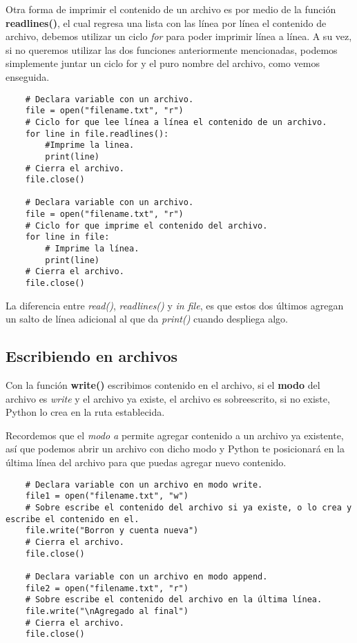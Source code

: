 Otra forma de imprimir el contenido de un archivo es por medio de la función \textbf{readlines()}, el cual regresa una lista con las línea por línea el contenido de archivo, debemos utilizar un ciclo \textit{for} para poder imprimir línea a línea. A su vez, si no queremos utilizar las dos funciones anteriormente mencionadas, podemos simplemente juntar un ciclo for y el puro nombre del archivo, como vemos enseguida.
\begin{lstlisting}
    # Declara variable con un archivo.
    file = open("filename.txt", "r")
    # Ciclo for que lee línea a línea el contenido de un archivo.
    for line in file.readlines():
        #Imprime la linea.
        print(line)
    # Cierra el archivo.
    file.close()

    # Declara variable con un archivo.
    file = open("filename.txt", "r")
    # Ciclo for que imprime el contenido del archivo.
    for line in file:
        # Imprime la línea.
        print(line)
    # Cierra el archivo.
    file.close()
\end{lstlisting}

La diferencia entre \textit{read()}, \textit{readlines()} y \textit{in file}, es que estos dos últimos agregan un salto de línea adicional al que da \textit{print()} cuando despliega algo.


\subsection{Escribiendo en archivos}

Con la función \textbf{write()} escribimos contenido en el archivo, si el \textbf{modo} del archivo es \textit{write} y el archivo ya existe, el archivo es sobreescrito, si no existe, Python lo crea en la ruta establecida.

Recordemos que el \textit{modo a} permite agregar contenido a un archivo ya existente, así que podemos abrir un archivo con dicho modo y Python te posicionará en la última línea del archivo para que puedas agregar nuevo contenido.
\begin{lstlisting}
    # Declara variable con un archivo en modo write.
    file1 = open("filename.txt", "w")
    # Sobre escribe el contenido del archivo si ya existe, o lo crea y escribe el contenido en el.
    file.write("Borron y cuenta nueva")
    # Cierra el archivo.
    file.close()

    # Declara variable con un archivo en modo append.
    file2 = open("filename.txt", "r")
    # Sobre escribe el contenido del archivo en la última línea.
    file.write("\nAgregado al final")
    # Cierra el archivo.
    file.close()
\end{lstlisting}

